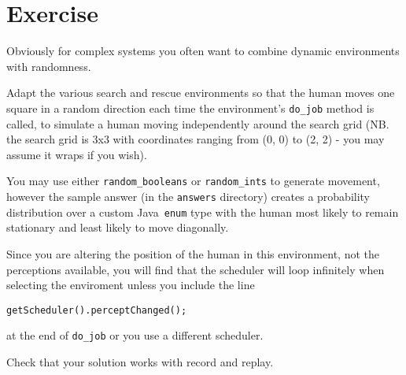 \section{Exercise}

Obviously for complex systems you often want to combine dynamic environments with randomness.  

Adapt the various search and rescue environments so that the human moves one square in a random direction each time the environment's \texttt{do\_job} method is called, to simulate a human moving independently around the search grid (NB. the search grid is 3x3 with coordinates ranging from (0, 0) to (2, 2) - you may assume it wraps if you wish).  

You may use either \texttt{random\_booleans} or \texttt{random\_ints} to generate movement, however the sample answer (in the \texttt{answers} directory) creates a probability distribution over a custom Java\ \texttt{enum} type with the human most likely to remain stationary and least likely to move diagonally.

Since you are altering the position of the human in this environment, not the perceptions available, you will find that the scheduler will loop infinitely when selecting the enviroment unless you include the line
\begin{verbatim}
getScheduler().perceptChanged();
\end{verbatim}
at the end of \texttt{do\_job} or you use a different scheduler.

Check that your solution works with record and replay.
